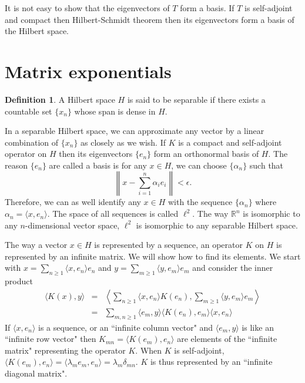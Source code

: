 \documentclass{article}
\theoremstyle{plain}
\numberwithin{thm}{section}
\theoremstyle{plain}
\numberwithin{prop}{section}
\theoremstyle{definition}
\newtheorem{defn}{Definition}
\numberwithin{defn}{section}
\theoremstyle{remark}
\numberwithin{equation}{section}
\begin{document}
It is not easy to show that the eigenvectors of $T$ form a basis. If $T$ is
self-adjoint and compact then Hilbert-Schmidt theorem then its eigenvectors
form a basis of the Hilbert space.

\section{Matrix exponentials}\label{s6}
\begin{defn}\label{s6d1}
A Hilbert space $H$ is said to be separable if there exists a countable set
$\{x_n\}$ whose span is dense in $H$.
\end{defn}
In a separable Hilbert space, we can approximate any vector by a linear 
combination of $\{x_n\}$ as closely as we wish. If $K$ is a compact and 
self-adjoint operator
on $H$ then its eigenvectors $\{e_n\}$ form an orthonormal basis of $H$. The
reason $\{e_n\}$ are called a basis is for any $x \in H$, we can choose $\{
\alpha_n\}$ such that 
\[
\left\lVert x - \sum_{i=1}^n\alpha_i e_i\right\rVert < \epsilon.
\]Therefore,
we can as well identify any $x \in H$ with the sequence $\{\alpha_n\}$ where
$\alpha_n = \langle x, e_n\rangle$. The space of all sequences is called 
$\ell^2$. The way $\mathbb{R}^n$ is isomorphic to any $n$-dimensional vector
space, $\ell^2$ is isomorphic to any separable Hilbert space.

The way a vector $x \in H$ is represented by a sequence, an operator $K$ on
$H$ is represented by an infinite matrix. We will show how to find its elements.
We start with $x = \sum_{n \ge 1}\langle x, e_n\rangle e_n$ and $y = 
\sum_{m \ge 1}\langle y, e_m\rangle e_m$ and consider the inner product
\begin{eqnarray*}
\langle K(x), y\rangle &=& 
\left\langle\sum_{n\ge 1}\langle x, e_n\rangle K(e_n),
\sum_{m\ge 1}\langle y, e_m\rangle e_m\right\rangle \\
&=& \sum_{m,n\ge 1}\langle e_m, y\rangle\langle K(e_n), e_m\rangle
\langle x, e_n\rangle 
\end{eqnarray*}
If $\langle x, e_n\rangle$ is a sequence, or an ``infinite column vector" and
$\langle e_m, y\rangle$ is like an ``infinite row vector" then $K_{mn} = \langle 
K(e_m), e_n\rangle$ are elements of the ``infinite matrix" representing the
operator $K$. When $K$ is self-adjoint, $\langle K(e_m), e_n\rangle = \langle
\lambda_m e_m, e_n\rangle = \lambda_m \delta_{mn}$. $K$ is thus represented
by an ``infinite diagonal matrix".
\end{document}
